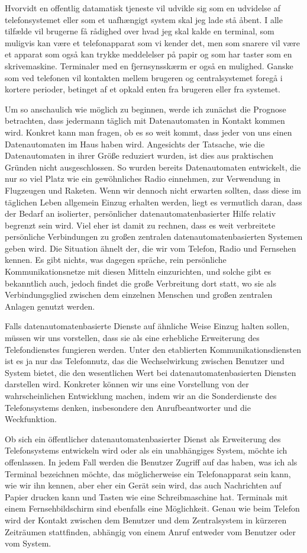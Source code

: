 {Hvorvidt en offentlig datamatisk tjeneste vil udvikle sig som en udvidelse af telefonsystemet eller som et uafhængigt system skal jeg lade stå åbent. I alle tilfælde vil brugerne få rådighed over hvad jeg skal kalde en terminal, som muligvis kan være et telefonapparat som vi kender det, men som snarere vil være et apparat som også kan trykke meddelelser på papir og som har taster som en skrivemaskine. Terminaler med en fjernsynsskærm er også en mulighed. Ganske som ved telefonen vil kontakten mellem brugeren og centralsystemet foregå i kortere perioder, betinget af et opkald enten fra brugeren eller fra systemet.
}{
Um so anschaulich wie möglich zu beginnen, werde ich zunächst die Prognose betrachten, dass jedermann täglich mit Datenautomaten in Kontakt kommen wird. Konkret kann man fragen, ob es so weit kommt, dass jeder von uns einen Datenautomaten im Haus haben wird. Angesichts der Tatsache, wie die Datenautomaten in ihrer Größe reduziert wurden, ist dies aus praktischen Gründen nicht ausgeschlossen. So wurden bereits Datenautomaten entwickelt, die nur so viel Platz wie ein gewöhnliches Radio einnehmen, zur Verwendung in Flugzeugen und Raketen. Wenn wir dennoch nicht erwarten sollten, dass diese im täglichen Leben allgemein Einzug erhalten werden, liegt es vermutlich daran, dass der Bedarf an isolierter, persönlicher datenautomatenbasierter Hilfe relativ begrenzt sein wird. Viel eher ist damit zu rechnen, dass es weit verbreitete persönliche Verbindungen zu großen zentralen datenautomatenbasierten Systemen geben wird. Die Situation ähnelt der, die wir vom Telefon, Radio und Fernsehen kennen. Es gibt nichts, was dagegen spräche, rein persönliche Kommunikationsnetze mit diesen Mitteln einzurichten, und solche gibt es bekanntlich auch, jedoch findet die große Verbreitung dort statt, wo sie als Verbindungsglied zwischen dem einzelnen Menschen und großen zentralen Anlagen genutzt werden.

Falls datenautomatenbasierte Dienste auf ähnliche Weise Einzug halten sollen, müssen wir uns vorstellen, dass sie als eine erhebliche Erweiterung des Telefondienstes fungieren werden. Unter den etablierten Kommunikationsdiensten ist es ja nur das Telefonnutz, das die Wechselwirkung zwischen Benutzer und System bietet, die den wesentlichen Wert bei datenautomatenbasierten Diensten darstellen wird. Konkreter können wir uns eine Vorstellung von der wahrscheinlichen Entwicklung machen, indem wir an die Sonderdienste des Telefonsystems denken, insbesondere den Anrufbeantworter und die Weckfunktion.

Ob sich ein öffentlicher datenautomatenbasierter Dienst als Erweiterung des Telefonsystems entwickeln wird oder als ein unabhängiges System, möchte ich offenlassen. In jedem Fall werden die Benutzer Zugriff auf das haben, was ich als Terminal bezeichnen möchte, das möglicherweise ein Telefonapparat sein kann, wie wir ihn kennen, aber eher ein Gerät sein wird, das auch Nachrichten auf Papier drucken kann und Tasten wie eine Schreibmaschine hat. Terminals mit einem Fernsehbildschirm sind ebenfalls eine Möglichkeit. Genau wie beim Telefon wird der Kontakt zwischen dem Benutzer und dem Zentralsystem in kürzeren Zeiträumen stattfinden, abhängig von einem Anruf entweder vom Benutzer oder vom System.
}

